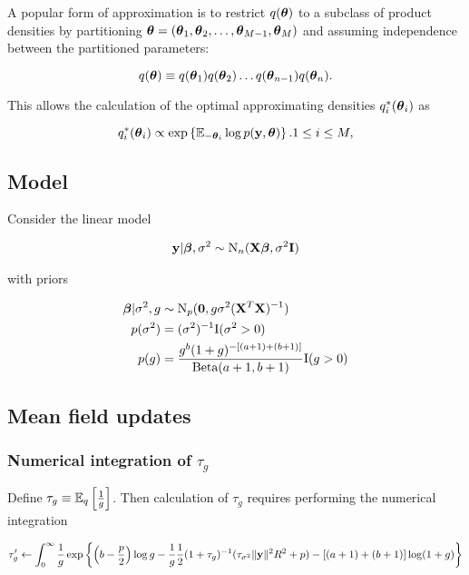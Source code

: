 \documentclass{amsart}[12pt]
\begin{document}
A popular form of approximation is to restrict $q({\boldsymbol \theta})$ to a subclass of product densities by partitioning
${\boldsymbol \theta} = ({\boldsymbol \theta}_1, {\boldsymbol \theta}_2, \ldots, {\boldsymbol \theta}_{M-1}, {\boldsymbol \theta}_M)$ and assuming independence between the
partitioned parameters:

\begin{equation*}
q({\boldsymbol \theta}) \equiv q({\boldsymbol \theta}_1) q({\boldsymbol \theta}_2) \ldots q({\boldsymbol \theta}_{n-1}) q({\boldsymbol \theta}_n).
\end{equation*}

This allows the calculation of the optimal approximating densities $q_i^*({\boldsymbol \theta}_i)$ as

\begin{equation*}
q_i^*({\boldsymbol \theta}_i) \propto \exp \left \{ \mathbb{E}_{-{\boldsymbol \theta}_i} \log p({\bf y}, {\boldsymbol \theta}) \right \}. 1 \leq i \leq M,
\end{equation*}

\subsection{Model}

Consider the linear model

\begin{align*}
{\bf y} | {\boldsymbol \beta}, \sigma^2 \sim \text{N}_n({\bf X} {\boldsymbol \beta}, \sigma^2 {\bf I})
\end{align*}

with priors

\begin{align*}
{\boldsymbol\beta} | \sigma^2, g &\sim \text{N}_p({\bf 0}, g \sigma^2 ({\bf X}^T {\bf X})^{-1}) \\
p(\sigma^2) &= (\sigma^2)^{-1} \text{I}(\sigma^2 > 0) \\
p(g) &= \frac{g^b (1 + g)^{-[(a + 1) + (b + 1)]}}{\text{Beta}(a + 1, b + 1)} \text{I}(g > 0)
\end{align*}

\subsection{Mean field updates}

\subsubsection{Numerical integration of $\tau_g$}\label{sec:num_int}

Define $\tau_g \equiv \mathbb{E}_q \left[ \frac{1}{g} \right]$. Then calculation of $\tau_g$ requires performing the 
numerical integration

\begin{align*}
\tau_g' \leftarrow \int_0^\infty \frac{1}{g} \exp \left \{ \left(b - \frac{p}{2}\right) \log g - \frac{1}{g} \frac{1}{2} (1 + \tau_g)^{-1} (\tau_{\sigma^2} \|{\bf y}\|^2 R^2 + p)
	- [(a + 1) + (b + 1)] \log(1 + g)  \right \}
\end{align*}
\end{document}

